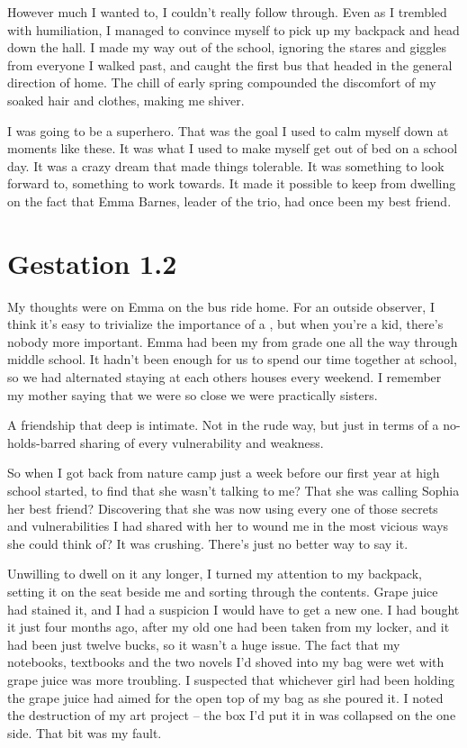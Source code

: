 However much I wanted to, I couldn't really follow through. Even as I trembled with humiliation, I managed to convince myself to pick up my backpack and head down the hall. I made my way out of the school, ignoring the stares and giggles from everyone I walked past, and caught the first bus that headed in the general direction of home. The chill of early spring compounded the discomfort of my soaked hair and clothes, making me shiver.

I was going to be a superhero. That was the goal I used to calm myself down at moments like these. It was what I used to make myself get out of bed on a school day. It was a crazy dream that made things tolerable. It was something to look forward to, something to work towards. It made it possible to keep from dwelling on the fact that Emma Barnes, leader of the trio, had once been my best friend.


\chapter{Gestation 1.2}

My thoughts were on Emma on the bus ride home. For an outside observer, I think it's easy to trivialize the importance of a , but when you're a kid, there's nobody more important. Emma had been my  from grade one all the way through middle school. It hadn't been enough for us to spend our time together at school, so we had alternated staying at each others houses every weekend. I remember my mother saying that we were so close we were practically sisters.

A friendship that deep is intimate. Not in the rude way, but just in terms of a no-holds-barred sharing of every vulnerability and weakness.

So when I got back from nature camp just a week before our first year at high school started, to find that she wasn't talking to me? That she was calling Sophia her best friend? Discovering that she was now using every one of those secrets and vulnerabilities I had shared with her to wound me in the most vicious ways she could think of? It was crushing. There's just no better way to say it.

Unwilling to dwell on it any longer, I turned my attention to my backpack, setting it on the seat beside me and sorting through the contents. Grape juice had stained it, and I had a suspicion I would have to get a new one. I had bought it just four months ago, after my old one had been taken from my locker, and it had been just twelve bucks, so it wasn't a huge issue. The fact that my notebooks, textbooks and the two novels I'd shoved into my bag were wet with grape juice was more troubling. I suspected that whichever girl had been holding the grape juice had aimed for the open top of my bag as she poured it. I noted the destruction of my art project -- the box I'd put it in was collapsed on the one side. That bit was my fault.

